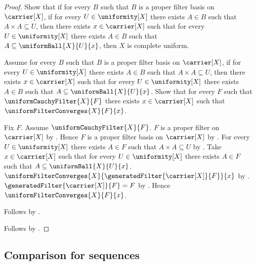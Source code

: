 \begin{proof}
    Show that if for every $B$ such that
        $B$ is a proper filter basis on $\carrier[X]$, if
        for every $U\in\uniformity[X]$ there exists $A\in B$ such that
            $A\times A\subseteq U$, then there exists $x\in\carrier[X]$
        such that for every $U\in\uniformity[X]$ there exists $A\in B$
        such that $A\subseteq\uniformBall{X}{U}{x}$, then
        $X$ is complete uniform.
    \begin{subproof}
        Assume for every $B$ such that
            $B$ is a proper filter basis on $\carrier[X]$, if
            for every $U\in\uniformity[X]$ there exists $A\in B$ such that
                $A\times A\subseteq U$, then there exists
            $x\in\carrier[X]$ such that for every $U\in\uniformity[X]$
            there exists $A\in B$ such that
                $A\subseteq\uniformBall{X}{U}{x}$.
        Show that for every $F$ such that $\uniformCauchyFilter{X}{F}$
            there exists $x\in\carrier[X]$ such that
                $\uniformFilterConverges{X}{F}{x}$.
        \begin{subproof}
            Fix $F$.
            Assume $\uniformCauchyFilter{X}{F}$.
            $F$ is a proper filter on $\carrier[X]$
                by .
            Hence $F$ is a proper filter basis on $\carrier[X]$
                by .
            For every $U\in\uniformity[X]$ there exists $A\in F$
                such that $A\times A\subseteq U$
                by .
            Take $x\in\carrier[X]$ such that for every
                $U\in\uniformity[X]$ there exists $A\in F$ such that
                $A\subseteq\uniformBall{X}{U}{x}$.
            $\uniformFilterConverges{X}
                {\generatedFilter{\carrier[X]}{F}}{x}$
                by .
            $\generatedFilter{\carrier[X]}{F}=F$
                by .
            Hence $\uniformFilterConverges{X}{F}{x}$.
        \end{subproof}
        Follows by .
    \end{subproof}
    Follows by \auto.
\end{proof}

\subsection{Comparison for sequences}

